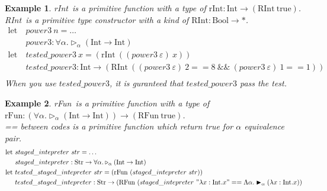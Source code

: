 \documentclass[9pt, a4paper]{extarticle}
\theoremstyle{break}
\newtheorem{ex}{Example}
\newcommand{\TW}{\triangleright}
\newcommand{\TB}{\blacktriangleright}
\begin{document}
\fi

\begin{ex}
	\newcommand{\I}{\textrm{Int}}
	\newcommand{\B}{\textrm{Bool}}
	\newcommand{\RI}{\textrm{RInt}}
	\newcommand{\rI}{\textrm{rInt}}
	\rI\ is a primitive function with a type of $\rI : \I \to (\RI\ \text{true})$.\\
	\RI\ is a primitive type constructor with a kind of $\RI : \B \to *$.
	\begin{align*}
		\text{let}\  & power3\ n = \hdots                                                                                  \\
		             & power3 : \forall\alpha. \TW_\alpha(\I \to \I)                                                       \\
		\text{let}\  & tested\_power3\ x = (\rI\ ((power3\ \varepsilon)\ x))                                               \\
		             & tested\_power3 : \I \to (\RI\ ((power3\ \varepsilon)\ 2 == 8\ \&\&\ (power3\ \varepsilon)\ 1 == 1)) \\
	\end{align*}
	When you use $tested\_power3$, it is guranteed that $tested\_power3$ pass the test.
\end{ex}

\begin{ex}
	\newcommand{\I}{\textrm{Int}}
	\newcommand{\Exp}{\textrm{Str}}
	\newcommand{\RI}{\textrm{RFun}}
	\newcommand{\rI}{\textrm{rFun}}
	\rI\ is a primitive function with a type of $\rI : (\forall\alpha.\TW_\alpha(\I \to \I)) \to (\RI\ \text{true})$.\\
	== between codes is a primitive function which return true for $\alpha$ equivalence pair.
	\begin{align*}
		\text{let}\  & staged\_intepreter\ str = \hdots                                                                                                \\
		             & staged\_intepreter : \Exp \to \forall\alpha.\TW_\alpha(\I \to \I)                                                               \\
		\text{let}\  & tested\_staged\_intepreter\ str = (\rI\ (staged\_intepreter\ str))                                                              \\
		             & tested\_staged\_intepreter : \Exp \to (\RI\ (staged\_intepreter\ "\lambda x:\I.x" == \Lambda\alpha.\TB_\alpha (\lambda x:\I.x)) \\
	\end{align*}
\end{ex}
\end{document}
